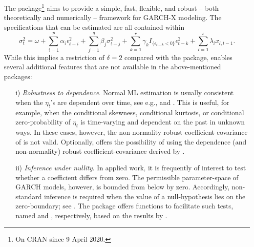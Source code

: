 The  package\footnote{On CRAN since 9 April 2020.} aims to provide a simple, fast, flexible, and robust -- both theoretically and numerically -- framework for GARCH-X modeling. The specifications that can be estimated are all contained within 
%
\begin{equation}\label{eq:garch-x}
	\sigma_t^2 = \omega + \sum_{i=1}^p \alpha_i \epsilon_{t-i}^2 + \sum_{j=1}^q \beta_j \sigma_{t-j}^2 + \sum_{k=1}^r \gamma_k I_{ \{\epsilon_{t-k} < 0 \} } \epsilon_{t-k}^2 + \sum_{l=1}^s \lambda_l x_{l,t-1}.
\end{equation}
%
While this implies a restriction of $\delta=2$ compared with the  package,  enables several additional features that are not available in the above-mentioned packages:
%
\begin{itemize}	
	\item[i)] \textit{Robustness to dependence}. Normal ML estimation is usually consistent when the $\eta_t$'s are dependent over time, see e.g., \citet{Escanciano2009} and \citet{FrancqThieu2018}. This is useful, for example, when the conditional skewness, conditional kurtosis, or conditional zero-probability of $\eta_t$ is time-varying and dependent on the past in unknown ways. In these cases, however, the non-normality robust coefficient-covariance of \citet{Bollerslevetal92a} is not valid. Optionally,  offers the possibility of using the dependence (and non-normality) robust coefficient-covariance derived by \citet{FrancqThieu2018}.

	\item[ii)] \textit{Inference under nullity}. In applied work, it is frequently of interest to test whether a coefficient differs from zero. The permissible parameter-space of GARCH models, however, is bounded from below by zero. Accordingly, non-standard inference is required when the value of a null-hypothesis lies on the zero-boundary; see \citet{FrancqThieu2018}. The  package offers functions to facilitate such tests, named  and , respectively, based on the results by \citet{FrancqThieu2018}.


\end{itemize}
